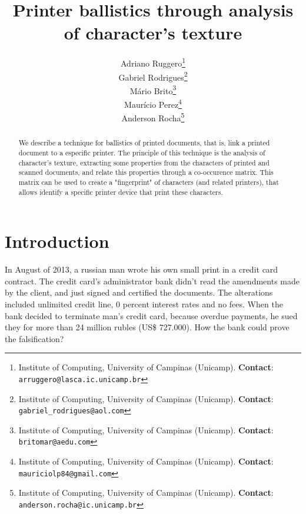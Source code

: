 \documentclass[10pt,twocolumn,letterpaper]{article}
\begin{document}
\title{Printer ballistics through analysis of character's texture}
\author{Adriano Ruggero\thanks{Institute of Computing, University of Campinas (Unicamp). \textbf{Contact}: \tt\small{arruggero@lasca.ic.unicamp.br}}\\
Gabriel Rodrigues\thanks{Institute of Computing, University of Campinas (Unicamp). \textbf{Contact}: \tt\small{gabriel\_rodrigues@aol.com}}\\
Mário Brito\thanks{Institute of Computing, University of Campinas (Unicamp). \textbf{Contact}:
\tt\small{britomar@aedu.com}}\\
Maurício Perez\thanks{Institute of Computing, University of Campinas (Unicamp). \textbf{Contact}:
\tt\small{mauriciolp84@gmail.com}}\\
Anderson Rocha\thanks{Institute of Computing, University of Campinas (Unicamp). \textbf{Contact}: \tt\small{anderson.rocha@ic.unicamp.br}}
}

\maketitle
\begin{abstract}
We describe a technique for ballistics of printed documents, that is, link a printed document to a especific printer. The principle of this technique is the analysis of character's texture, extracting some properties from the characters of printed and scanned documents, and relate this properties through a co-occurence matrix. This matrix can be used to create a "fingerprint" of characters (and related printers), that allows identify a specific printer device that print these characters.
\end{abstract}

\section{Introduction}
In August of 2013, a russian man wrote his own small print in a credit card contract. The credit card's administrator bank didn't read the amendments made by the client, and just signed and certified the documents. The alterations included unlimited credit line, 0 percent interest rates and no fees. When the bank decided to terminate man's credit card, because overdue payments, he sued they for more than 24 million rubles (US\$ 727.000). How the bank could prove the falsification?
\end{document}
